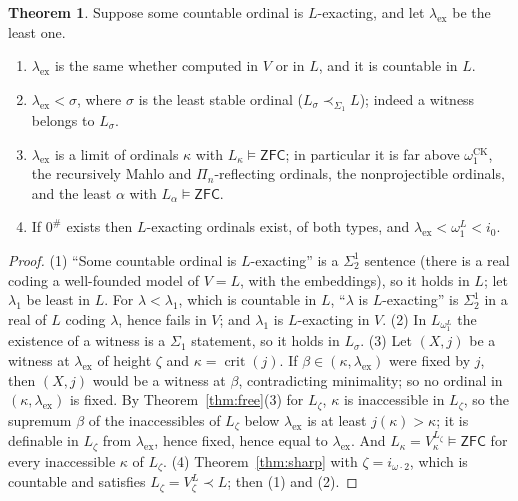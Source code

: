 \documentclass[11pt,letterpaper]{article}
\theoremstyle{definition}
\newtheorem{theorem}[definition]{Theorem}
\numberwithin{equation}{section}
\newcommand{\ZFC}{\mathsf{ZFC}}
\newcommand{\crit}{\operatorname{crit}}
\begin{document}
\begin{theorem}\label{thm:ordinal}
Suppose some countable ordinal is $L$-exacting, and let $\lambda_{\mathrm{ex}}$ be the least one.
\begin{enumerate}
\item $\lambda_{\mathrm{ex}}$ is the same whether computed in $V$ or in $L$, and it is countable in $L$.
\item $\lambda_{\mathrm{ex}}<\sigma$, where $\sigma$ is the least stable ordinal ($L_\sigma\prec_{\Sigma_1}L$); indeed a witness belongs to $L_\sigma$.
\item $\lambda_{\mathrm{ex}}$ is a limit of ordinals $\kappa$ with $L_\kappa\models\ZFC$; in particular it is far above $\omega_1^{\mathrm{CK}}$, the recursively Mahlo and $\Pi_n$-reflecting ordinals, the nonprojectible ordinals, and the least $\alpha$ with $L_\alpha\models\ZFC$.
\item If $0^\#$ exists then $L$-exacting ordinals exist, of both types, and $\lambda_{\mathrm{ex}}<\omega_1^L<i_0$.
\end{enumerate}
\end{theorem}

\begin{proof}
(1) ``Some countable ordinal is $L$-exacting'' is a $\Sigma^1_2$ sentence (there is a real coding a well-founded model of $V=L$, with the embeddings), so it holds in $L$; let $\lambda_1$ be least in $L$. For $\lambda<\lambda_1$, which is countable in $L$, ``$\lambda$ is $L$-exacting'' is $\Sigma^1_2$ in a real of $L$ coding $\lambda$, hence fails in $V$; and $\lambda_1$ is $L$-exacting in $V$. (2) In $L_{\omega_1^L}$ the existence of a witness is a $\Sigma_1$ statement, so it holds in $L_\sigma$. (3) Let $(X,j)$ be a witness at $\lambda_{\mathrm{ex}}$ of height $\zeta$ and $\kappa=\crit(j)$. If $\beta\in(\kappa,\lambda_{\mathrm{ex}})$ were fixed by $j$, then $(X,j)$ would be a witness at $\beta$, contradicting minimality; so no ordinal in $(\kappa,\lambda_{\mathrm{ex}})$ is fixed. By Theorem~\ref{thm:free}(3) for $L_\zeta$, $\kappa$ is inaccessible in $L_\zeta$, so the supremum $\beta$ of the inaccessibles of $L_\zeta$ below $\lambda_{\mathrm{ex}}$ is at least $j(\kappa)>\kappa$; it is definable in $L_\zeta$ from $\lambda_{\mathrm{ex}}$, hence fixed, hence equal to $\lambda_{\mathrm{ex}}$. And $L_\kappa=V^{L_\zeta}_\kappa\models\ZFC$ for every inaccessible $\kappa$ of $L_\zeta$. (4) Theorem~\ref{thm:sharp} with $\zeta=i_{\omega\cdot2}$, which is countable and satisfies $L_\zeta=V^L_\zeta\prec L$; then (1) and (2).
\end{proof}
\end{document}

